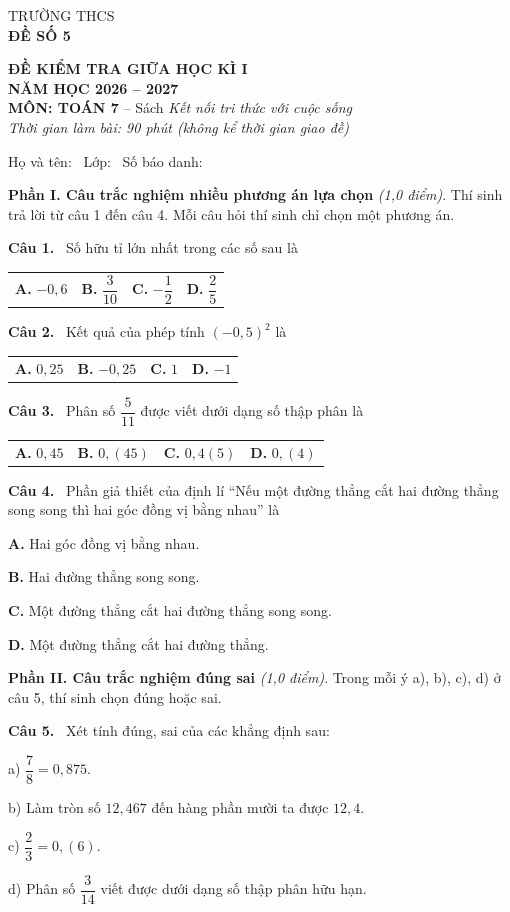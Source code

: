 \documentclass[12pt,a4paper]{article}
\makeatletter
\newcommand{\bonpa}[4]{\par\noindent\begin{tabularx}{\linewidth}{@{\hspace{0.6cm}}XXXX@{}}
\textbf{A.} #1 & \textbf{B.} #2 & \textbf{C.} #3 & \textbf{D.} #4\end{tabularx}\par}
\newcommand{\motpa}[4]{\par\hspace*{0.6cm}\textbf{A.} #1\par\hspace*{0.6cm}\textbf{B.} #2\par
\hspace*{0.6cm}\textbf{C.} #3\par\hspace*{0.6cm}\textbf{D.} #4\par}
\newcommand{\cau}[1]{\par\medskip\textbf{Câu #1.}~}
\newcommand{\y}[1]{\par\hspace*{0.6cm}#1}
\newcommand{\phan}[1]{\par\bigskip{\large\textbf{#1}}\par\smallskip}
\makeatother
\begin{document}
\noindent
\begin{minipage}[t]{0.38\linewidth}\centering
TRƯỜNG THCS \dotfill\\[2pt]
\textbf{ĐỀ SỐ 5}
\end{minipage}\hfill
\begin{minipage}[t]{0.6\linewidth}\centering
\textbf{ĐỀ KIỂM TRA GIỮA HỌC KÌ I}\\
\textbf{NĂM HỌC 2026 -- 2027}\\
\textbf{MÔN: TOÁN 7} -- Sách \textit{Kết nối tri thức với cuộc sống}\\
\textit{Thời gian làm bài: 90 phút (không kể thời gian giao đề)}
\end{minipage}

\medskip
Họ và tên: \dotfill\ Lớp: \makebox[2cm]{\dotfill}\ Số báo danh: \makebox[2.5cm]{\dotfill}
\phan{A. TRẮC NGHIỆM (3,0 điểm)}
\textbf{Phần I. Câu trắc nghiệm nhiều phương án lựa chọn} \textit{(1,0 điểm)}. Thí sinh trả lời từ câu 1 đến câu 4. Mỗi câu hỏi thí sinh chỉ chọn một phương án.
\cau{1} Số hữu tỉ lớn nhất trong các số sau là
\bonpa{$-0{,}6$}{$\dfrac{3}{10}$}{$-\dfrac{1}{2}$}{$\dfrac{2}{5}$}
\cau{2} Kết quả của phép tính $(-0{,}5)^{2}$ là
\bonpa{$0{,}25$}{$-0{,}25$}{$1$}{$-1$}
\cau{3} Phân số $\dfrac{5}{11}$ được viết dưới dạng số thập phân là
\bonpa{$0{,}45$}{$0{,}(45)$}{$0{,}4(5)$}{$0{,}(4)$}
\cau{4} Phần giả thiết của định lí “Nếu một đường thẳng cắt hai đường thẳng song song thì hai góc đồng vị bằng nhau” là
\motpa{Hai góc đồng vị bằng nhau.}{Hai đường thẳng song song.}{Một đường thẳng cắt hai đường thẳng song song.}{Một đường thẳng cắt hai đường thẳng.}

\medskip\textbf{Phần II. Câu trắc nghiệm đúng sai} \textit{(1,0 điểm)}. Trong mỗi ý a), b), c), d) ở câu 5, thí sinh chọn đúng hoặc sai.
\cau{5} Xét tính đúng, sai của các khẳng định sau:
\y{a) $\dfrac{7}{8}=0{,}875$.}
\y{b) Làm tròn số $12{,}467$ đến hàng phần mười ta được $12{,}4$.}
\y{c) $\dfrac{2}{3}=0{,}(6)$.}
\y{d) Phân số $\dfrac{3}{14}$ viết được dưới dạng số thập phân hữu hạn.}
\end{document}
